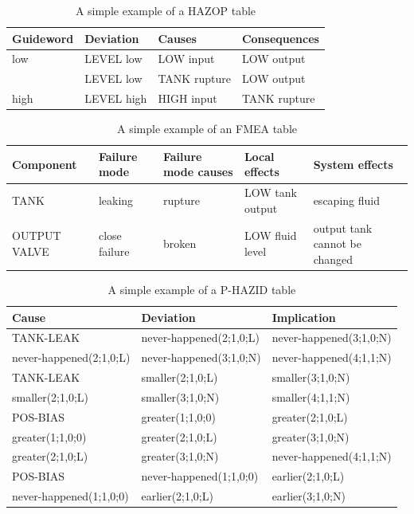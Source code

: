 \documentclass[conference]{IEEEtran}
\begin{document}
\begin{table}
\centering
\begin{tabular}{|l|l|l|l|}
\hline
Guideword & Deviation & Causes & Consequences \\
\hline
\hline
low & LEVEL low & LOW input & LOW output \\
& LEVEL low & TANK rupture & LOW output \\
\hline
high & LEVEL high & HIGH input & TANK rupture \\
\hline
\end{tabular}
\caption{A simple example of a HAZOP table}
\label{tab:ehazop}
\end{table}

\begin{table}
\centering
\begin{tabular}{|l|l|l|l|l|}
\hline
Component & Failure mode & Failure mode causes & Local effects & System effects \\
\hline
\hline
TANK & leaking & rupture & LOW tank output & escaping fluid \\
\hline
OUTPUT VALVE & close failure & broken & LOW fluid level & output tank cannot be changed \\
\hline
\end{tabular}
\caption{A simple example of an FMEA table}
\label{tab:efmea}
\end{table}

\begin{table}
\centering
\begin{tabular}{|l|l|l|}
\hline
Cause & Deviation & Implication \\
\hline
\hline
TANK-LEAK & never-happened(2;1,0;L) & never-happened(3;1,0;N) \\
\hline
never-happened(2;1,0;L) & never-happened(3;1,0;N) & never-happened(4;1,1;N) \\
\hline
TANK-LEAK & smaller(2;1,0;L) & smaller(3;1,0;N) \\
\hline
smaller(2;1,0;L) & smaller(3;1,0;N) & smaller(4;1,1;N) \\
\hline
POS-BIAS & greater(1;1,0;0) & greater(2;1,0;L) \\
\hline
greater(1;1,0;0) & greater(2;1,0;L) & greater(3;1,0;N) \\
\hline
greater(2;1,0;L) & greater(3;1,0;N) & never-happened(4;1,1;N) \\
\hline
POS-BIAS& never-happened(1;1,0;0) & earlier(2;1,0;L) \\
\hline
never-happened(1;1,0;0) & earlier(2;1,0;L) & earlier(3;1,0;N) \\
\hline
\end{tabular}
\caption{A simple example of a P-HAZID table}
\label{tab:eprochazid}
\end{table}
\end{document}

